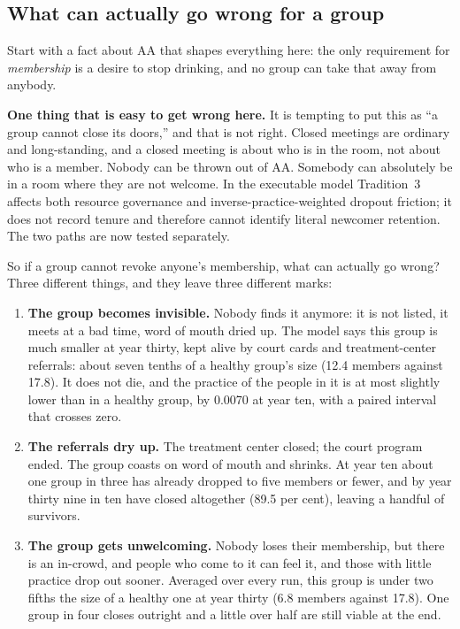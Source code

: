 \documentclass[11pt,a4paper]{article}
\begin{document}
\subsection{What can actually go wrong for a group}

Start with a fact about AA that shapes everything here: the only requirement for
\emph{membership} is a desire to stop drinking, and no group can take that away
from anybody.

\textbf{One thing that is easy to get wrong here.} It is tempting to put this as
``a group cannot close its doors,'' and that is not right. Closed meetings are
ordinary and long-standing, and a closed meeting is about who is in the room, not
about who is a member. Nobody can be thrown out of AA. Somebody can absolutely be
in a room where they are not welcome. In the executable model Tradition~3 affects
both resource governance and inverse-practice-weighted dropout friction; it does
not record tenure and therefore cannot identify literal newcomer retention. The
two paths are now tested separately.

So if a group cannot revoke anyone's membership, what can actually go wrong? Three
different things, and they leave three different marks:

\begin{enumerate}
\item \textbf{The group becomes invisible.} Nobody finds it anymore: it is not
listed, it meets at a bad time, word of mouth dried up. The model says this group
is much smaller at year thirty, kept alive by court cards and treatment-center referrals:
about seven tenths of a healthy group's size (12.4 members against 17.8). It does not die, and the practice of the people in it is at most slightly lower than
in a healthy group, by 0.0070 at year ten, with a paired interval that crosses zero.

\item \textbf{The referrals dry up.} The treatment center closed; the court program
ended. The group coasts on word of mouth and shrinks. At year ten about one group in
three has already dropped to five members or fewer, and by year thirty nine in ten
have closed altogether (89.5 per cent), leaving a handful of survivors.

\item \textbf{The group gets unwelcoming.} Nobody loses their membership, but there
is an in-crowd, and people who come to it can feel it, and those with little practice drop out sooner.
Averaged over every run, this group is under two fifths the size of a healthy one at
year thirty (6.8 members against 17.8). One group in four closes outright and a
little over half are still viable at the end.
\end{enumerate}
\end{document}
